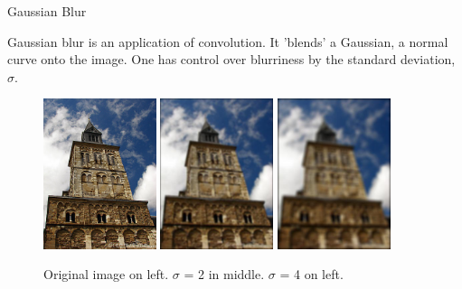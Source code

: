 \documentclass{beamer}
\begin{document}
\begin{frame}{Gaussian Blur}

Gaussian blur is an application of  convolution. It 'blends' a Gaussian, a normal curve onto the image. One has control over blurriness by the standard deviation, $\sigma$.


\begin{figure}[ht]
\includegraphics[width=1.3in]{churchin.jpg}
\hspace{.1in}
\includegraphics[width=1.3in]{churchoutblur.jpg}
\hspace{.1in}
\includegraphics[width=1.3in]{churchoutblur2.jpg}
\caption{Original image on left. $\sigma$ = 2 in middle. $\sigma$ = 4 on left.}
\end{figure}


\end{frame}
\end{document}
